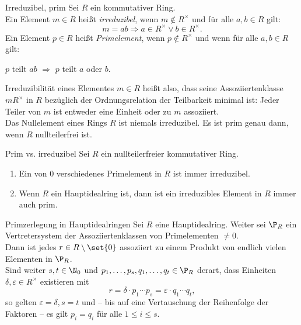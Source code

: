 \begin{karte}{Irreduzibel, prim}
    Sei \(R\) ein kommutativer Ring. \\
    Ein Element \(m\in R\) heißt \textit{irreduzibel}, 
    wenn \(m\notin R^\times \) und für alle \(a,b\in R\) gilt: 
    \[ m = ab \Rightarrow a\in R^\times \vee b\in R^\times. \]
    Ein Element \(p\in R\) heißt \textit{Primelement}, wenn \(p\notin R^\times\)
    und wenn für alle \(a,b\in R\) gilt: 
    \begin{center}
        \(p\) teilt \(ab\) \(\Rightarrow\) \(p\) teilt \(a\) oder \(b\).
    \end{center}
    Irreduzibilität eines Elementes \(m\in R\) heißt also, dass 
    seine Assoziiertenklasse \(m R^\times\) in \(R\) bezüglich der 
    Ordnungsrelation der Teilbarkeit minimal ist: Jeder Teiler 
    von \(m\) ist entweder eine Einheit oder zu \(m\) assoziiert. \\
    Das Nullelement eines Rings \(R\) ist niemals irreduzibel. Es ist 
    prim genau dann, wenn \(R\) nullteilerfrei ist. 
\end{karte}

\begin{karte}{Prim vs. irreduzibel}
    Sei \(R\) ein nullteilerfreier kommutativer Ring. 
    \begin{enumerate}
        \item Ein von \(0\) verschiedenes Primelement in \(R\) ist immer irreduzibel. 
        \item Wenn \(R\) ein Hauptidealring ist, dann ist ein irreduzibles Element in \(R\) immer auch prim.
    \end{enumerate}
\end{karte}

\begin{karte}{Primzerlegung in Hauptidealringen}
    Sei \(R\) eine Hauptidealring. Weiter sei \(\P_R\) ein 
    Vertretersystem der Assoziiertenklassen von Primelementen \(\neq 0\). \\
    Dann ist jedes \(r\in R \setminus \set{0}\) assoziiert zu einem Produkt 
    von endlich vielen Elementen in \(\P_R\).\\
    Sind weiter \(s,t\in \N_0\) und \(p_1, \ldots, p_s, q_1, \ldots, q_t \in \P_R\) 
    derart, dass Einheiten \(\delta, \varepsilon \in R^\times\) 
    existieren mit 
    \[ r = \delta \cdot p_1 \cdots p_s = \varepsilon \cdot q_1 \cdots q_t, \]
    so gelten \( \varepsilon = \delta, s = t \) und -- bis auf eine 
    Vertauschung der Reihenfolge der Faktoren -- es gilt \(p_i = q_i\) 
    für alle \(1 \leq i \leq s\).
\end{karte}

